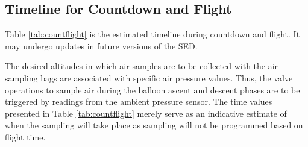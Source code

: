 \subsection{Timeline for Countdown and Flight}
Table \ref{tab:countflight} is the estimated timeline during countdown and flight. It may undergo updates in future versions of the SED.

The desired altitudes in which air samples are to be collected with the air sampling bags are associated with specific air pressure values. Thus, the valve operations to sample air during the balloon ascent and descent phases are to be triggered by readings from the ambient pressure sensor. The time values presented in Table \ref{tab:countflight} merely serve as an indicative estimate of when the sampling will take place as sampling will not be programmed based on flight time.

